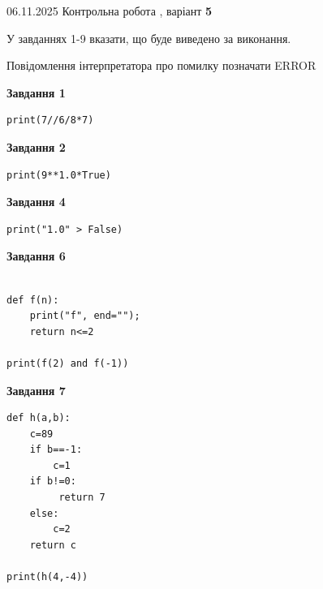 \documentclass[12pt, ukrainian]{article}
\begin{document}
{\Large{06.11.2025 Контрольна робота , варіант  \No \textbf { 5 }\par}}
{
\begin {large}
У завданнях 1-9 вказати, що буде виведено за виконання.

Повідомлення інтерпретатора про помилку позначати ERROR

\begin{minipage}[t]{7.5cm}

\begin{center}
\textbf{Завдання 1}
\end{center}

\begin{verbatim}
print(7//6/8*7)
\end{verbatim}



\begin{center}
\textbf{Завдання 2}
\end{center}

\begin{verbatim}
print(9**1.0*True)
\end{verbatim}



\begin{center}
\textbf{Завдання 4}
\end{center}

\begin{verbatim}
print("1.0" > False)
\end{verbatim}



\begin{center}
\textbf{Завдання 6}
\end{center}

\begin{verbatim}

def f(n):
    print("f", end="");
    return n<=2

print(f(2) and f(-1))
\end{verbatim}



\begin{center}
\textbf{Завдання 7}
\end{center}

\begin{verbatim}
def h(a,b):
    c=89
    if b==-1:
        c=1
    if b!=0:
         return 7
    else: 
        c=2
    return c

print(h(4,-4))
\end{verbatim}


\end{minipage}
\end{large}}
\end{document}
